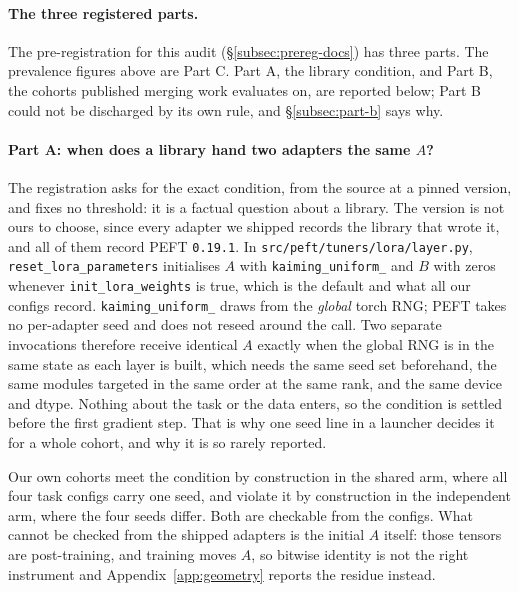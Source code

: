 \paragraph{The three registered parts.} The pre-registration for this audit
(\S\ref{subsec:prereg-docs}) has three parts. The prevalence figures above are
Part C. Part A, the library condition, and Part B, the cohorts published
merging work evaluates on, are reported below; Part B could not be discharged
by its own rule, and \S\ref{subsec:part-b} says why.

\paragraph{Part A: when does a library hand two adapters the same $A$?} The
registration asks for the exact condition, from the source at a pinned
version, and fixes no threshold: it is a factual question about a library. The
version is not ours to choose, since every adapter we shipped records the
library that wrote it, and all of them record PEFT \texttt{0.19.1}. In
\texttt{src/peft/tuners/lora/layer.py}, \texttt{reset\_lora\_parameters}
initialises $A$ with \texttt{kaiming\_uniform\_} and $B$ with zeros whenever
\texttt{init\_lora\_weights} is true, which is the default and what all our
configs record. \texttt{kaiming\_uniform\_} draws from the \emph{global} torch
RNG; PEFT takes no per-adapter seed and does not reseed around the call. Two
separate invocations therefore receive identical $A$ exactly when the global
RNG is in the same state as each layer is built, which needs the same seed set
beforehand, the same modules targeted in the same order at the same rank, and
the same device and dtype. Nothing about the task or the data enters, so the
condition is settled before the first gradient step. That is why one seed line
in a launcher decides it for a whole cohort, and why it is so rarely reported.

Our own cohorts meet the condition by construction in the shared arm, where
all four task configs carry one seed, and violate it by construction in the
independent arm, where the four seeds differ. Both are checkable from the
configs. What cannot be checked from the shipped adapters is the initial $A$
itself: those tensors are post-training, and training moves $A$, so bitwise
identity is not the right instrument and Appendix~\ref{app:geometry} reports
the residue instead.

